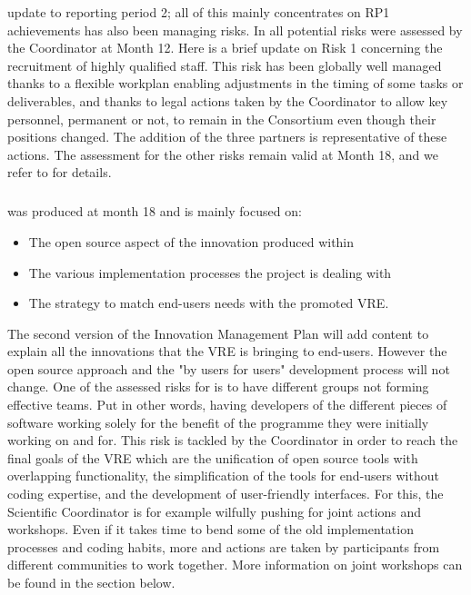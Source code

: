 \begin{oldpart}{update to reporting period 2; all of this mainly concentrates on RP1 achievements}
 has also been managing risks. In 
all potential risks were assessed by the Coordinator at Month 12. Here
is a brief update on Risk 1 concerning the recruitment of highly
qualified staff. This risk has been globally well managed thanks to a
flexible workplan enabling adjustments in the timing of some tasks or
deliverables, and thanks to legal actions taken by the Coordinator to
allow key personnel, permanent or not, to remain in the Consortium
even though their positions changed. The addition of the three
partners is representative of these actions. The assessment for the
other risks remain valid at Month 18, and we refer to
 for details.

\subparagraph{}

 was produced at month 18 and is mainly focused on:

\begin{itemize}
\item{The open source aspect of the innovation produced within \ODK}
\item{The various implementation processes the project is dealing with}
\item{The strategy to match end-users needs with the promoted VRE}.
\end{itemize}

  The second version of the Innovation Management Plan will add content to explain all the
  innovations that the VRE is bringing to end-users. However the open source approach and
  the "by users for users" development process will not change.  One
  of the assessed risks for \ODK is to have different groups not forming effective teams. Put
  in other words, having developers of the different pieces of software working solely for
  the benefit of the programme they were initially working on and for. This risk is
  tackled by the Coordinator in order to reach the final goals of the VRE which are the
  unification of open source tools with overlapping functionality, the simplification of
  the tools for end-users without coding expertise, and the development of user-friendly
  interfaces. For this, the Scientific Coordinator is for example wilfully pushing
  for joint actions and
  workshops. Even if it takes time to bend some of the old implementation processes and coding habits,
  more and actions are taken by \ODK participants from different communities to work
  together. More information on joint workshops can be found in the section below.
\end{oldpart}


